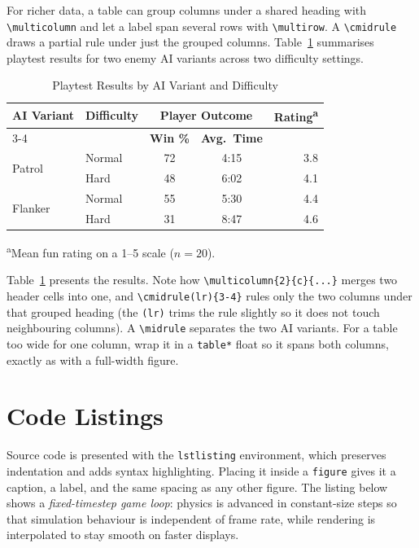 \documentclass[a4paper,twoside,twocolumn]{IEEEtran}
\begin{document}
For richer data, a table can group columns under a shared heading with
\verb|\multicolumn| and let a label span several rows with \verb|\multirow|. A
\verb|\cmidrule| draws a partial rule under just the grouped columns.
Table~\ref{tab:playtest} summarises playtest results for two enemy AI variants
across two difficulty settings.

\begin{table}[!t]
\caption{Playtest Results by AI Variant and Difficulty}
\label{tab:playtest}
\centering
\begin{tabular}{llccr}
\toprule
\multirow{2}{*}{\textbf{AI Variant}} & \multirow{2}{*}{\textbf{Difficulty}}
  & \multicolumn{2}{c}{\textbf{Player Outcome}} & \multirow{2}{*}{\textbf{Rating}\textsuperscript{a}}\\
\cmidrule(lr){3-4}
 & & \textbf{Win \%} & \textbf{Avg.\ Time} & \\
\midrule
\multirow{2}{*}{Patrol}  & Normal & 72 & 4:15 & 3.8\\
                         & Hard   & 48 & 6:02 & 4.1\\
\midrule
\multirow{2}{*}{Flanker} & Normal & 55 & 5:30 & 4.4\\
                         & Hard   & 31 & 8:47 & 4.6\\
\bottomrule
\end{tabular}

\vspace{2pt}
{\footnotesize \textsuperscript{a}Mean fun rating on a 1--5 scale ($n=20$).}
\end{table}

Table~\ref{tab:playtest} presents the results. Note how
\verb|\multicolumn{2}{c}{...}| merges two header cells into one, and
\verb|\cmidrule(lr){3-4}| rules only the two columns under that grouped heading
(the \verb|(lr)| trims the rule slightly so it does not touch neighbouring
columns). A \verb|\midrule| separates the two AI variants. For a table too wide
for one column, wrap it in a \verb|table*| float so it spans both columns,
exactly as with a full-width figure.



\section{Code Listings}\label{sec:code}

Source code is presented with the \texttt{lstlisting} environment, which
preserves indentation and adds syntax highlighting. Placing it inside a
\texttt{figure} gives it a caption, a label, and the same spacing as any other
figure. The listing below shows a \emph{fixed-timestep game loop}: physics is
advanced in constant-size steps so that simulation behaviour is independent of
frame rate, while rendering is interpolated to stay smooth on faster displays.
\end{document}
